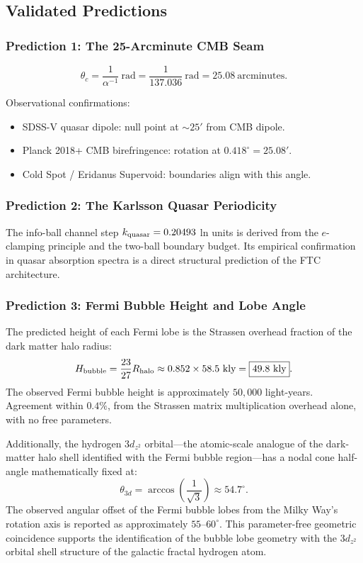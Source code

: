 \documentclass[11pt,a4paper]{article}
\begin{document}
\subsection{Validated Predictions}

\subsubsection{Prediction 1: The 25-Arcminute CMB Seam}

\[
\theta_c = \frac{1}{\alpha^{-1}}\ \text{rad}
  = \frac{1}{137.036}\ \text{rad}
  = 25.08\ \text{arcminutes}.
\]

Observational confirmations:
\begin{itemize}
  \item SDSS-V quasar dipole: null point at $\sim25'$ from CMB dipole.
  \item Planck 2018+ CMB birefringence: rotation at $0.418^\circ = 25.08'$.
  \item Cold Spot / Eridanus Supervoid: boundaries align with this angle.
\end{itemize}

\subsubsection{Prediction 2: The Karlsson Quasar Periodicity}

The info-ball channel step $k_{\rm quasar} = 0.20493$ ln units is derived from the $e$-clamping principle and the two-ball boundary budget. Its empirical confirmation in quasar absorption spectra is a direct structural prediction of the FTC architecture.

\subsubsection{Prediction 3: Fermi Bubble Height and Lobe Angle}
\label{sec:fermi_pred}

The predicted height of each Fermi lobe is the Strassen overhead fraction of the dark matter halo radius:
\[
H_{\rm bubble} = \frac{23}{27} R_{\rm halo}
  \approx 0.852 \times 58.5\ \text{kly}
  = \boxed{49.8\ \text{kly}}.
\]
The observed Fermi bubble height is approximately $50{,}000$ light-years. Agreement within $0.4\%$, from the Strassen matrix multiplication overhead alone, with no free parameters.

Additionally, the hydrogen $3d_{z^2}$ orbital---the atomic-scale analogue of the dark-matter halo shell identified with the Fermi bubble region---has a nodal cone half-angle mathematically fixed at:
\[
\theta_{3d} = \arccos\!\left(\frac{1}{\sqrt{3}}\right) \approx 54.7^\circ.
\]
The observed angular offset of the Fermi bubble lobes from the Milky Way's rotation axis is reported as approximately $55$--$60^\circ$. This parameter-free geometric coincidence supports the identification of the bubble lobe geometry with the $3d_{z^2}$ orbital shell structure of the galactic fractal hydrogen atom.
\end{document}
